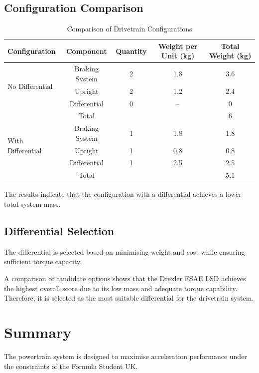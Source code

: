 \subsection{Configuration Comparison}

\begin{table}[H]
\centering
\caption{Comparison of Drivetrain Configurations}
\label{tab:drivetrain_comparison}
\begin{tabular}{lcccc}
\toprule
Configuration & Component & Quantity & Weight per Unit (kg) & Total Weight (kg) \\
\midrule
\multirow{3}{*}{No Differential} 
& Braking System & 2 & 1.8 & 3.6 \\
& Upright & 2 & 1.2 & 2.4 \\
& Differential & 0 & -- & 0 \\
& Total & & & 6 \\
\midrule
\multirow{3}{*}{With Differential} 
& Braking System & 1 & 1.8 & 1.8 \\
& Upright & 1 & 0.8 & 0.8 \\
& Differential & 1 & 2.5 & 2.5 \\
& Total & & & 5.1 \\
\bottomrule
\end{tabular}
\end{table}

The results indicate that the configuration with a differential achieves a lower total system mass.

\subsection{Differential Selection}

The differential is selected based on minimising weight and cost while ensuring sufficient torque capacity.

A comparison of candidate options shows that the Drexler FSAE LSD \cite{Drexler_FSAE_LSD_data_sheet}
achieves the highest overall score due to its low mass and adequate torque capability. Therefore, it is selected as the most suitable differential for the drivetrain system.

\section{Summary}

The powertrain system is designed to maximise acceleration performance under the constraints of the Formula Student UK.

